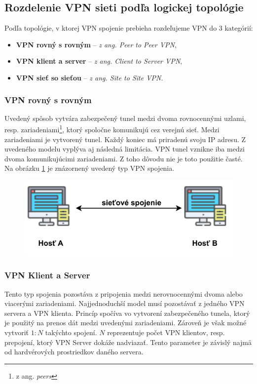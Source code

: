 \subsection{Rozdelenie VPN sieti podľa logickej topológie}
 Podľa topológie, v ktorej VPN spojenie prebieha rozdeľujeme VPN do 3 kategórií: 
\begin{itemize}
	\item \textbf{VPN rovný s rovným} -- \textit{z ang. Peer to Peer VPN},
	\item \textbf{VPN klient a server} -- \textit{z ang. Client to Server VPN}, 
	\item \textbf{VPN sieť so sieťou} -- \textit{z ang. Site to Site VPN}.
\end{itemize}

\subsubsection{VPN rovný s rovným}
Uvedený spôsob vytvára zabezpečený tunel medzi dvoma rovnocennými uzlami, resp. zariadeniami\footnote{z ang. \textit{peers}}, ktorý spoločne komunikujú cez verejnú sieť. Medzi zariadeniami je vytvorený tunel. Každý koniec má priradenú svoju IP adresu. Z uvedeného modelu vyplýva aj následná limitácia. VPN tunel vznikne iba medzi dvoma komunikujúcimi zariadeniami. Z toho dôvodu nie je toto použitie časté. Na obrázku \ref{p2p} je znázornený uvedený typ VPN spojenia. 
\begin{figure}[!ht]
	\centering
	\includegraphics[width=.7\textwidth]{figures/p2p}
	\caption{}
	\label{p2p}
\end{figure}
 
\subsubsection{VPN Klient a Server}
Tento typ spojenia pozostáva z pripojenia medzi nerovnocennými dvoma alebo viacerými zariadeniami. Najjednoduchší model musí pozostávať z jedného VPN servera a VPN klienta. Princíp spočíva vo vytvorení zabezpečeného tunela, ktorý je použitý na prenos dát medzi uvedenými zariadeniami. Zároveň je však možné vytvoriť $1:N$ takýchto spojení. $N$ reprezentuje počet VPN klientov, resp. prepojení, ktorý VPN Server dokáže nadviazať. Tento parameter je závislý najmä od hardvérových prostriedkov daného servera.

